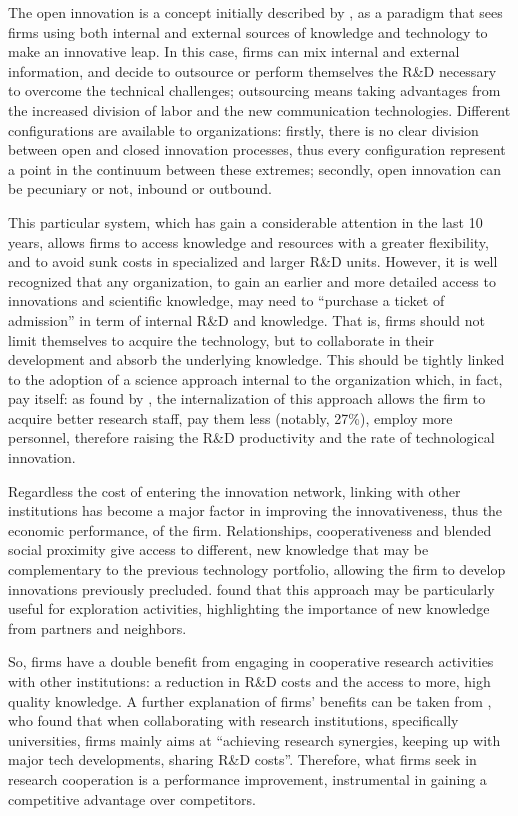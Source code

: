 The open innovation is a concept initially described by \citet{Chesbrough2003}, as a paradigm that sees firms using both internal and external sources of knowledge and technology to make an innovative leap. In this case, firms can mix internal and external information, and decide to outsource or perform themselves the R\&D necessary to overcome the technical challenges; outsourcing  means taking advantages from the increased division of labor and the new communication technologies. Different configurations are available to organizations: firstly, there is no clear division between open and closed innovation processes, thus every configuration represent a point in the continuum between these extremes; secondly, open innovation can be pecuniary or not, inbound or outbound. 

This particular system, which has gain a considerable attention in the last 10 years, allows firms to access knowledge and resources with a greater flexibility, and to avoid sunk costs in specialized and larger R\&D units. However, it is well recognized that any organization, to gain an earlier and more detailed access to innovations and scientific knowledge, may need to \enquote{purchase a ticket of admission} in term of internal R\&D and knowledge. That is, firms should not limit themselves to acquire the technology, but to collaborate in their development and absorb the underlying knowledge. This should be tightly linked to the adoption of a science approach internal to the organization which, in fact, pay itself: as found by \citet{Stern2004}, the internalization of this approach allows the firm to acquire better research staff, pay them less (notably, 27\%), employ more personnel, therefore raising the R\&D productivity and the rate of technological innovation. 

Regardless the cost of entering the innovation network, linking with other institutions has become a major factor in improving the innovativeness, thus the economic performance, of the firm. Relationships, cooperativeness and blended social proximity give access to different, new knowledge that may be complementary to the previous technology portfolio, allowing the firm to develop innovations previously precluded. \citet{Bercovitz2006} found that this approach may be particularly useful for exploration activities, highlighting the importance of new knowledge from partners and neighbors.

So, firms have a double benefit from engaging in cooperative research activities with other institutions: a reduction in R\&D costs and the access to more, high quality knowledge. A further explanation of firms' benefits can be taken from \citet{Caloghirou2001}, who found that when collaborating with research institutions, specifically universities, firms mainly aims at \enquote{achieving research synergies, keeping up with major tech developments, sharing R\&D costs}. Therefore, what firms seek in research cooperation is a performance improvement, instrumental in gaining a competitive advantage over competitors. 

